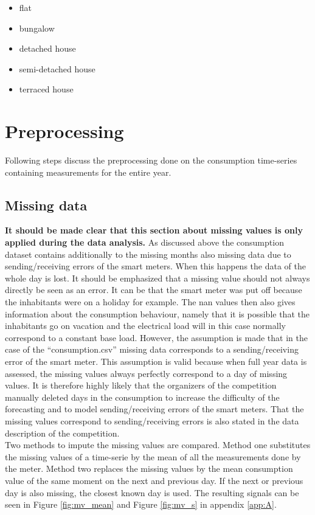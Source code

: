 \begin{itemize}
	\item flat
	\item bungalow
	\item detached house
	\item semi-detached house
	\item terraced house
\end{itemize}


\section{Preprocessing}

Following steps discuss the preprocessing done on the consumption time-series containing measurements for the entire year. 

\subsection{Missing data} \label{s:missing_data}
\textbf{It should be made clear that this section about missing values is only applied during the data analysis.}
As discussed above the consumption dataset contains additionally to the missing months also missing data due to sending/receiving errors of the smart meters. When this happens the data of the whole day is lost. It should be emphasized that a missing value should not always directly be seen as an error. It can be that the smart meter was put off because the inhabitants were on a holiday for example. The nan values then also gives information about the consumption behaviour, namely that it is possible that the inhabitants go on vacation and the electrical load will in this case normally correspond to a constant base load. However, the assumption is made that in the case of the ``consumption.csv'' missing data corresponds to a sending/receiving error of the smart meter. This assumption is valid because when full year data is assessed, the missing values always perfectly correspond to a day of missing values. It is therefore highly likely that the organizers of the competition manually deleted days in the consumption to increase the difficulty of the forecasting and to model sending/receiving errors of the smart meters. That the missing values correspond to sending/receiving errors is also stated in the data description of the competition.\\

 Two methods to impute the missing values are compared. Method one substitutes the missing values of a time-serie by the mean of all the measurements done by the meter. Method two replaces the missing values by the mean consumption value of the same moment on the next and previous day. If the next or previous day is also missing, the closest known day is used. The resulting signals can be seen in Figure \ref{fig:mv_mean} and Figure \ref{fig:mv_s} in appendix \ref{app:A}.\\
 

